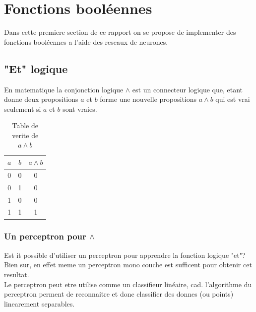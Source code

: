 \documentclass[twoside,openright,a4paper,11pt,french]{article}
\begin{document}
\pagestyle{plain}
\setlength{\parindent}{0pt}



\parskip=0pt
\tableofcontents
\clearpage


\vspace{5cm}


\section{Fonctions booléennes}

Dans cette premiere section de ce rapport on se propose
de implementer des fonctions booléennes a l'aide des reseaux
de neurones. 

\subsection{"Et" logique}

En matematique la conjonction logique $\land$ est un
connecteur logique que, etant donne deux propositions $a$ et $b$
forme une nouvelle propositions $a \land b$ qui est vrai seulement
si $a$ et $b$ sont vraies.

\begin{table}[ht]
  \centering
  \begin{tabular}{| c | c | c |}
    \hline
    \textbf{$a$} & \textbf{$b$} & \textbf{$a \land b$}\\
    \hline
    0 & 0  & 0 \\
    \hline
    0 & 1  & 0 \\
    \hline
    1 & 0  & 0 \\
    \hline
    1 & 1  & 1 \\
    \hline
  \end{tabular}
  \caption{Table de verite de $a \land b$}
  \label{tab:et}
\end{table}




\subsubsection{Un perceptron pour $\land$} 

Est it possible d'utiliser un perceptron pour apprendre la fonction logique
"et"? Bien sur, en effet meme un perceptron mono couche est sufficent pour
obtenir cet resultat.\\

Le perceptron peut etre utilise comme un classifieur linéaire, cad. l'algorithme du
perceptron perment de reconnaitre et donc classifier des donnes (ou points)
linearement separables.\\
\end{document}
